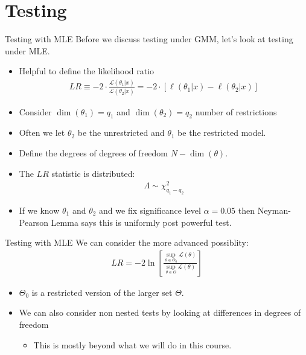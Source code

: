 \documentclass[aspectratio=169]{beamer}
\begin{document}
\section{Testing}

\begin{frame}{Testing with MLE}
Before we discuss testing under GMM, let's look at testing under MLE.
\begin{itemize}
\item Helpful to define the \alert{likelihood ratio}
\begin{align*}
LR \equiv -2 \cdot \frac{\mathcal{L}(\theta_1 | x)}{\mathcal{L}(\theta_2 | x)} = -2 \cdot \left[ \ell(\theta_1 | x) - \ell(\theta_2 | x) \right]
\end{align*}
\item Consider $\dim(\theta_1) = q_1$ and $\dim(\theta_2) = q_2$ \alert{number of restrictions}
\item Often we let $\theta_2$ be the \alert{unrestricted} and $\theta_1$ be the \alert{restricted} model.
\item Define the degrees of \alert{degrees of freedom} $N - \dim(\theta)$.
\item The $LR$ statistic is distributed:
\begin{align*}
 \Lambda \sim \chi^2_{q_1-q_2}
\end{align*}
\item If we know $\theta_1$ and $\theta_2$ and we fix significance level $\alpha =0.05$ then \alert{Neyman-Pearson Lemma} says this is \alert{uniformly post powerful test}.
\end{itemize}
\end{frame}

\begin{frame}{Testing with MLE}
We can consider the more advanced possiblity:
\begin{align*}
L R=-2 \ln \left[\frac{\sup _{\theta \in \Theta_{0}} \mathcal{L}(\theta)}{\sup _{\theta \in \Theta} \mathcal{L}(\theta)}\right]
\end{align*}
\begin{itemize}
\item $\Theta_0$ is a restricted version of the larger set $\Theta$.
\item We can also consider \alert{non nested tests} by looking at differences in \alert{degrees of freedom}
\begin{itemize}
\item This is mostly beyond what we will do in this course.
\end{itemize}
\end{itemize}
\end{frame}
\end{document}
